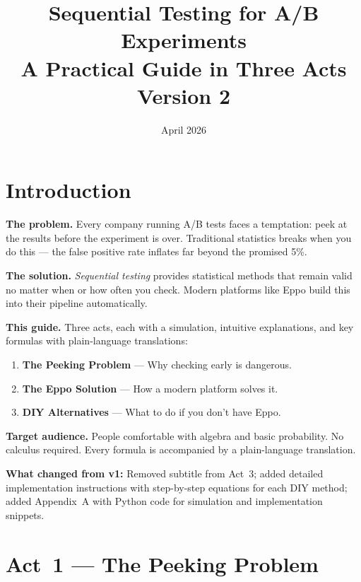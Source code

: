 \documentclass[12pt, a4paper]{article}
\title{\textbf{Sequential Testing for A/B Experiments}\\[6pt]
       \large A Practical Guide in Three Acts\\[4pt]
       \normalsize Version 2}
\author{}
\date{April 2026}
\begin{document}
\maketitle
\tableofcontents
\newpage

\section*{Introduction}

\textbf{The problem.}
Every company running A/B tests faces a temptation: peek at the results
before the experiment is over.  Traditional statistics breaks when you do
this --- the false positive rate inflates far beyond the promised 5\%.

\textbf{The solution.}
\emph{Sequential testing} provides statistical methods that remain valid
no matter when or how often you check.  Modern platforms like Eppo build
this into their pipeline automatically.

\textbf{This guide.}
Three acts, each with a simulation, intuitive explanations, and key formulas
with plain-language translations:
\begin{enumerate}[nosep]
  \item \textbf{The Peeking Problem} --- Why checking early is dangerous.
  \item \textbf{The Eppo Solution} --- How a modern platform solves it.
  \item \textbf{DIY Alternatives} --- What to do if you don't have Eppo.
\end{enumerate}

\textbf{Target audience.}
People comfortable with algebra and basic probability.  No calculus required.
Every formula is accompanied by a plain-language translation.

\textbf{What changed from v1:}
Removed subtitle from Act~3; added detailed implementation instructions
with step-by-step equations for each DIY method; added Appendix~A with
Python code for simulation and implementation snippets.


\newpage
\section{Act~1 --- The Peeking Problem}
\end{document}
